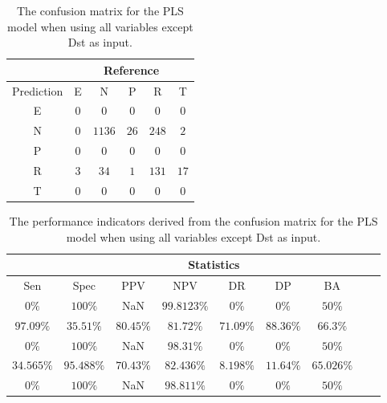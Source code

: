 \begin{table}[!ht]
	\centering
	\begin{tabular}{|c|c|c|c|c|c|}
		\hline
		 & \multicolumn{5}{|c|}{Reference} \\ \hline
		 Prediction & E & N & P & R & T \\ \hline
		 E & $0$ & $0$ & $0$ & $0$ & $0$ \\ \hline
		 N & $0$ & $1136$ & $26$ & $248$ & $2$ \\ \hline
		 P & $0$ & $0$ & $0$ & $0$ & $0$ \\ \hline
		 R & $3$ & $34$ & $1$ & $131$ & $17$ \\ \hline
		 T & $0$ & $0$ & $0$ & $0$ & $0$ \\ \hline
	\end{tabular}
	\caption{The confusion matrix for the PLS model when using all variables except Dst as input.}
	\label{tab:cm:noDst:pls}
\end{table}

\begin{table}[!ht]
	\centering
	\begin{tabular}{|c|c|c|c|c|c|c|c|c|}
		\hline
		 & \multicolumn{7}{c|}{Statistics} \\ \hline
		Sen & Spec & PPV & NPV & DR & DP & BA \\ \hline
		$0\%$ & $100\%$ & NaN & $99.8123\%$ & $0\%$ & $0\%$ & $50\%$ \\ \hline
		$97.09\%$ & $35.51\%$ & $80.45\%$ & $81.72\%$ & $71.09\%$ & $88.36\%$ & $66.3\%$ \\ \hline
		$0\%$ & $100\%$ & NaN & $98.31\%$ & $0\%$ & $0\%$ & $50\%$ \\ \hline
		$34.565\%$ & $95.488\%$ & $70.43\%$ & $82.436\%$ & $8.198\%$ & $11.64\%$ & $65.026\%$ \\ \hline
		$0\%$ & $100\%$ & NaN & $98.811\%$ & $0\%$ & $0\%$ & $50\%$ \\ \hline
	\end{tabular}
	\caption{The performance indicators derived from the confusion matrix for the PLS model when using all variables except Dst as input.}
	\label{tab:cs:noDst:pls}
\end{table}

